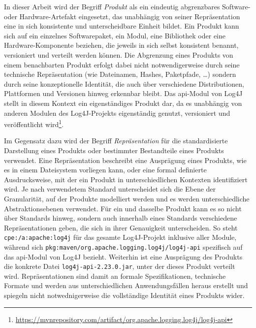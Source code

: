 In dieser Arbeit wird der Begriff \textit{Produkt} als ein eindeutig abgrenzbares Software- oder Hardware-Artefakt eingesetzt, das unabhängig von seiner Repräsentation eine in sich konsistente und unterscheidbare Einheit bildet.
Ein Produkt kann sich auf ein einzelnes Softwarepaket, ein Modul, eine Bibliothek oder eine Hardware-Komponente beziehen, die jeweils in sich selbst konsistent benannt, versioniert und verteilt werden können.
Die Abgrenzung eines Produkts von einem benachbarten Produkt erfolgt dabei nicht notwendigerweise durch seine technische Repräsentation (wie Dateinamen, Hashes, Paketpfade, \ldots) sondern durch seine konzeptionelle Identität, die auch über verschiedene Distributionen, Plattformen und Versionen hinweg erkennbar bleibt.
Das \acrshort{api}-Modul von Log4J stellt in diesem Kontext ein eigenständiges Produkt dar, da es unabhängig von anderen Modulen des Log4J-Projekts eigenständig genutzt, versioniert und veröffentlicht wird\footnote{\url{https://mvnrepository.com/artifact/org.apache.logging.log4j/log4j-api}}.

Im Gegensatz dazu wird der Begriff \textit{Repräsentation} für die standardisierte Darstellung eines Produkts oder bestimmter Bestandteile eines Produkts verwendet.
Eine Repräsentation beschreibt eine Ausprägung eines Produkts, wie es in einem Dateisystem vorliegen kann, oder eine formal definierte Ausdrucksweise, mit der ein Produkt in unterschiedlichen Kontexten identifiziert wird.
Je nach verwendetem Standard unterscheidet sich die Ebene der Granularität, auf der Produkte modelliert werden und es werden unterschiedliche Abstraktionsebenen verwendet.
Für ein und dasselbe Produkt kann es so nicht über Standards hinweg, sondern auch innerhalb eines Standards verschiedene Repräsentationen geben, die sich in ihrer Genauigkeit unterscheiden.
So steht \texttt{cpe:/a:apache:log4j} für das gesamte Log4J-Projekt inklusive aller Module, während sich \texttt{pkg:maven/org.apache.logging.log4j/log4j-api} spezifisch auf das \acrshort{api}-Modul von Log4J bezieht.
Weiterhin ist eine Ausprägung des Produkts die konkrete Datei \texttt{log4j-api-2.23.0.jar}, unter der dieses Produkt verteilt wird.
Repräsentationen sind damit an formale Spezifikationen, technische Formate und werden aus unterschiedlichen Anwendungsfällen heraus erstellt und spiegeln nicht notwednigerweise die vollständige Identität eines Produkts wider.

